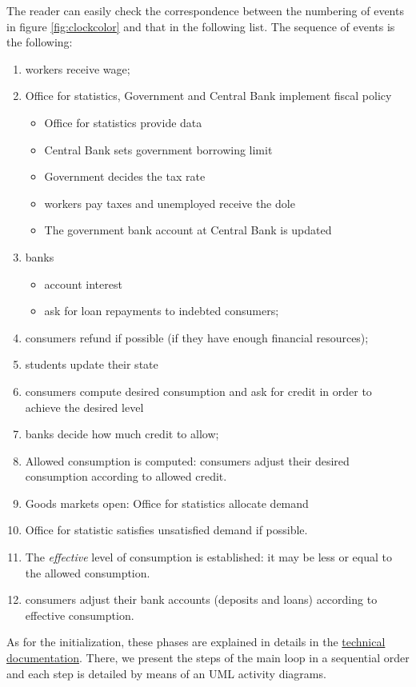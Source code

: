 \documentclass{book}
\newcommand{\doclocation}{file:///Users/giulioni/Documents/workspace/gabriele/docs}
\begin{document}
The reader can easily check the correspondence between the numbering of events in figure \ref{fig:clockcolor} and that in the following list. The sequence of events is the following:
\begin{enumerate}
	\item workers receive wage;
	\item Office for statistics, Government and Central Bank implement fiscal policy
		\begin{itemize}
			\item Office for statistics provide data
			\item Central Bank sets government borrowing limit
			\item Government decides the tax rate
			\item workers pay taxes and unemployed receive the dole
			\item The government bank account at Central Bank is updated
		\end{itemize}
	\item banks 
		\begin{itemize}
			\item account interest
			\item ask for loan repayments to indebted consumers;
		\end{itemize}
	\item consumers refund if possible (if they have enough financial resources);
	\item students update their state
	\item consumers compute desired consumption and ask for credit in order to achieve the desired level 
	\item banks decide how much credit to allow;
	\item Allowed consumption is computed: consumers adjust their desired consumption according to allowed credit. 
	\item Goods markets open: Office for statistics allocate demand
	\item Office for statistic satisfies unsatisfied demand if possible.
	\item The \textit{effective} level of consumption is established: it may be less or equal to the allowed consumption.
	\item consumers adjust their bank accounts (deposits and loans) according to effective consumption.
\end{enumerate}

As for the initialization, these phases are explained in details in the \href{\doclocation/index_loop.html}{technical documentation}. There, we present the steps of the main loop in a sequential order and each step is detailed by means of an UML activity diagrams.
\end{document}
